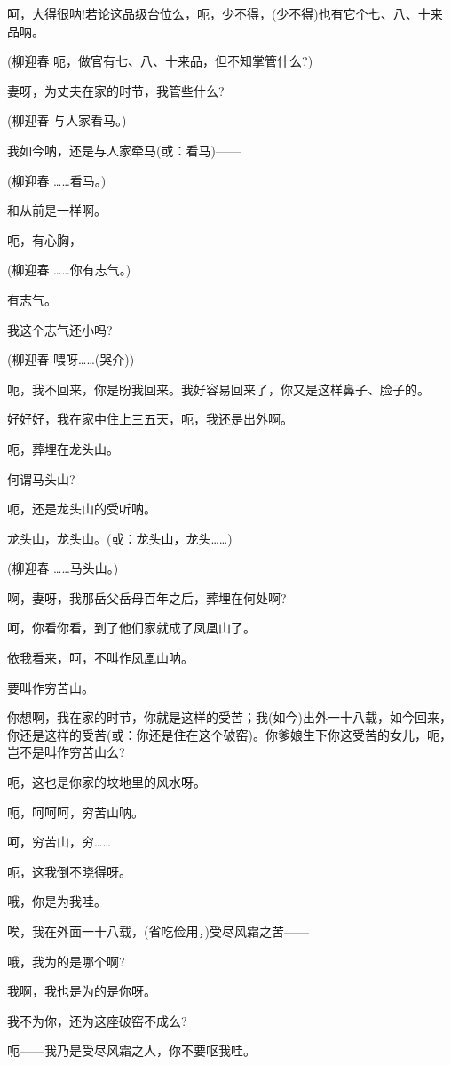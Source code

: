 呵，大得很呐!若论这品级台位么，呃，少不得，(少不得)也有它个七、八、十来品呐。

(柳迎春 呃，做官有七、八、十来品，但不知掌管什么?)

妻呀，为丈夫在家的时节，我管些什么?

(柳迎春 与人家看马。)

我如今呐，还是与人家牵马(或：看马)------

(柳迎春 \ldots{}\ldots{}看马。)

和从前是一样啊。

呃，有心胸，

(柳迎春 \ldots{}\ldots{}你有志气。)

有志气。

我这个志气还小吗?

(柳迎春 喂呀\ldots{}\ldots{}(哭介))

呃，我不回来，你是盼我回来。我好容易回来了，你又是这样鼻子、脸子的。

好好好，我在家中住上三五天，呃，我还是出外啊。

呃，葬埋在龙头山。

何谓马头山?

呃，还是龙头山的受听呐。

龙头山，龙头山。(或：龙头山，龙头\ldots{}\ldots{})

(柳迎春 \ldots{}\ldots{}马头山。)

啊，妻呀，我那岳父岳母百年之后，葬埋在何处啊?

呵，你看你看，到了他们家就成了凤凰山了。

依我看来，呵，不叫作凤凰山呐。

要叫作穷苦山。

你想啊，我在家的时节，你就是这样的受苦；我(如今)出外一十八载，如今回来，你还是这样的受苦(或：你还是住在这个破窑)。你爹娘生下你这受苦的女儿，呃，岂不是叫作穷苦山么?

呃，这也是你家的坟地里的风水呀。

呃，呵呵呵，穷苦山呐。

呵，穷苦山，穷\ldots{}\ldots{}

呃，这我倒不晓得呀。

哦，你是为我哇。

唉，我在外面一十八载，(省吃俭用，)受尽风霜之苦------

哦，我为的是哪个啊?

我啊，我也是为的是你呀。

我不为你，还为这座破窑不成么?

呃------我乃是受尽风霜之人，你不要呕我哇。

